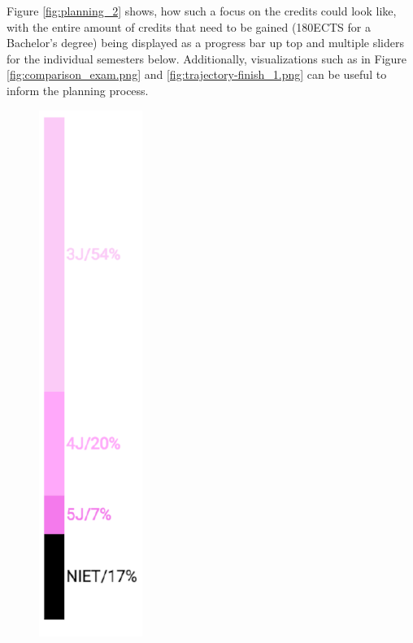 Figure \ref{fig:planning_2} shows, how such a focus on the credits could look like, with the entire amount of credits that need to be gained (180ECTS for a Bachelor's degree) being displayed as a progress bar up top and multiple sliders for the individual semesters below.
Additionally, visualizations such as in Figure \ref{fig:comparison_exam.png} and \ref{fig:trajectory-finish_1.png} can be useful to inform the planning process.

\begin{figure}
    \begin{minipage}[b]{0.48\textwidth}
        \centering
        \includegraphics[width=0.3\textwidth]{figures/trajectory-finish_1.png}
        \hfill

\end{minipage}
\end{figure}
